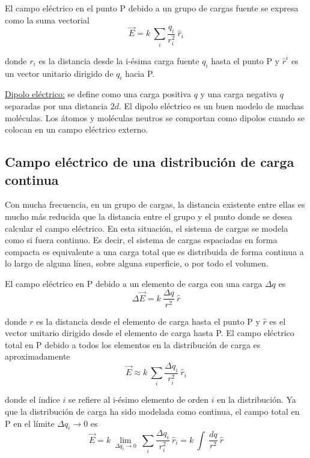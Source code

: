     \PN El campo eléctrico en el punto P debido a un grupo de cargas fuente se expresa como la suma vectorial
    \begin{equation*}
      \vec{E} = k \ \sum_{i} \frac{q_{i}}{r_{i}^{2}} \ \hat{r}_{i}
    \end{equation*}

    \PN donde $r_{i}$ es la distancia desde la i-ésima carga fuente $q_{i}$ hasta el punto P y $\hat{r}^{i}$ es un
    vector unitario dirigido de $q_{i}$ hacia P.

    \VS
    \PN \underline{Dipolo eléctrico:} se define como una carga positiva $q$ y una carga negativa $q$ separadas por una
    distancia $2d$. El dipolo eléctrico es un buen modelo de muchas moléculas. Los átomos y moléculas neutros se
    comportan como dipolos cuando se colocan en un campo eléctrico externo.

  \subsection{Campo eléctrico de una distribución de carga continua}
    \PN Con mucha frecuencia, en un grupo de cargas, la distancia existente entre ellas es mucho más reducida que la
    distancia entre el grupo y el punto donde se desea calcular el campo eléctrico. En esta situación, el sistema de
    cargas se modela como si fuera continuo. Es decir, el sistema de cargas espaciadas en forma compacta es equivalente
    a una carga total que es distribuida de forma continua a lo largo de alguna línea, sobre alguna superficie, o por
    todo el volumen.

    \VS El campo eléctrico en P debido a un elemento de carga con una carga $\Delta q$ es
    \begin{equation*}
      \Delta \vec{E} = k \ \frac{\Delta q}{r^{2}} \ \hat{r}
    \end{equation*}

    \PN donde $r$ es la distancia desde el elemento de carga hasta el punto P y $\hat{r}$ es el vector unitario
    dirigido desde el elemento de carga hasta P. El campo eléctrico total en P debido a todos los elementos en la
    distribución de carga es aproximadamente
    \begin{equation*}
      \vec{E} \approx k \ \sum_{i} \frac{\Delta q_{i}}{r_{i}^{2}} \ \hat{r}_{i}
    \end{equation*}

    \PN donde el índice $i$ se refiere al i-ésimo elemento de orden $i$ en la distribución. Ya que la distribución de
    carga ha sido modelada como continua, el campo total en P en el límite $\Delta q_{i} \rightarrow 0$ es
    \begin{equation*}
      \vec{E} = k \ \lim_{\Delta q_{i} \rightarrow 0} \ \sum_{i} \frac{\Delta q_{i}}{r_{i}^{2}} \ \hat{r}_{i} = k \ \int
      \ \frac{dq}{r^{2}} \ \hat{r}
    \end{equation*}

